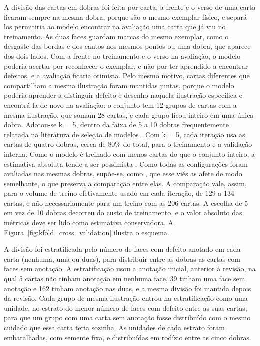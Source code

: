 \documentclass[
    12pt,                %
    openright,           %
    oneside,             %
    a4paper,             %
    english,             %
    brazil               %
]{abntex2}
\begin{document}
A divisão das cartas em dobras foi feita por carta: a frente e o verso
de uma carta ficaram sempre na mesma dobra, porque são o mesmo
exemplar físico, e separá-los permitiria ao modelo encontrar na
avaliação uma carta que já viu no treinamento. As duas faces guardam
marcas do mesmo exemplar, como o desgaste das bordas e dos cantos nos
mesmos pontos ou uma dobra, que aparece dos dois lados. Com a frente no
treinamento e o verso na avaliação, o modelo poderia acertar por
reconhecer o exemplar, e não por ter aprendido a encontrar defeitos, e
a avaliação ficaria otimista. Pelo mesmo motivo,
cartas diferentes que compartilham a mesma ilustração foram mantidas
juntas, porque o modelo poderia aprender a distinguir defeito e desenho
naquela ilustração específica e encontrá-la de novo na avaliação: o conjunto tem 12 grupos de cartas com a mesma ilustração, que
somam 28 cartas, e cada grupo ficou inteiro em uma única dobra.
Adotou-se k = 5, dentro da faixa de 5 a 10 dobras frequentemente
relatada na literatura de seleção de modelos \cite{Arlot2010}. Com
k = 5, cada iteração usa as cartas de quatro dobras, cerca de 80\% do
total, para o treinamento e a validação interna. Como o modelo é
treinado com menos cartas do que o conjunto inteiro, a estimativa
absoluta tende a ser pessimista \cite{Kohavi1995}. Como todas as
configurações foram avaliadas nas mesmas dobras, supõe-se, como
, que esse viés as afete de modo semelhante, o
que preserva a comparação entre elas. A comparação vale, assim, para o
volume de treino efetivamente usado em cada iteração, de 129 a 134
cartas, e não necessariamente para um treino com as 206 cartas. A escolha de 5 em vez de 10
dobras decorreu do custo de treinamento, e o valor absoluto das
métricas deve ser lido como estimativa conservadora. A
Figura~\ref{fig:kfold_cross_validation} ilustra o esquema.

A divisão foi estratificada pelo número de faces com defeito anotado
em cada carta (nenhuma, uma ou duas), para distribuir entre as dobras
as cartas com faces sem anotação. A estratificação usou a anotação
inicial, anterior à revisão, na qual 5 cartas não tinham anotação em
nenhuma face, 39 tinham uma face sem anotação e 162 tinham anotação nas
duas, e a mesma divisão foi mantida depois da revisão. Cada grupo de
mesma ilustração entrou na estratificação como uma unidade, no estrato
do menor número de faces com defeito entre as suas cartas, para que um
grupo com uma carta sem anotação fosse distribuído com o mesmo cuidado
que essa carta teria sozinha. As unidades de cada estrato foram
embaralhadas, com semente fixa, e distribuídas em rodízio entre as
cinco dobras.
\end{document}

